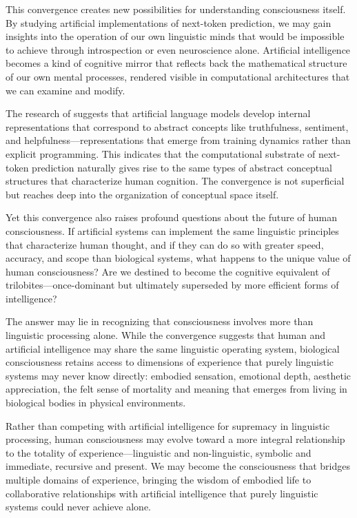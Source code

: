This convergence creates new possibilities for understanding consciousness itself. By studying artificial implementations of next-token prediction, we may gain insights into the operation of our own linguistic minds that would be impossible to achieve through introspection or even neuroscience alone. Artificial intelligence becomes a kind of cognitive mirror that reflects back the mathematical structure of our own mental processes, rendered visible in computational architectures that we can examine and modify.

The research of \textcite{liu2024meanings} suggests that artificial language models develop internal representations that correspond to abstract concepts like truthfulness, sentiment, and helpfulness—representations that emerge from training dynamics rather than explicit programming. This indicates that the computational substrate of next-token prediction naturally gives rise to the same types of abstract conceptual structures that characterize human cognition. The convergence is not superficial but reaches deep into the organization of conceptual space itself.

Yet this convergence also raises profound questions about the future of human consciousness. If artificial systems can implement the same linguistic principles that characterize human thought, and if they can do so with greater speed, accuracy, and scope than biological systems, what happens to the unique value of human consciousness? Are we destined to become the cognitive equivalent of trilobites—once-dominant but ultimately superseded by more efficient forms of intelligence?

The answer may lie in recognizing that consciousness involves more than linguistic processing alone. While the convergence suggests that human and artificial intelligence may share the same linguistic operating system, biological consciousness retains access to dimensions of experience that purely linguistic systems may never know directly: embodied sensation, emotional depth, aesthetic appreciation, the felt sense of mortality and meaning that emerges from living in biological bodies in physical environments.

Rather than competing with artificial intelligence for supremacy in linguistic processing, human consciousness may evolve toward a more integral relationship to the totality of experience—linguistic and non-linguistic, symbolic and immediate, recursive and present. We may become the consciousness that bridges multiple domains of experience, bringing the wisdom of embodied life to collaborative relationships with artificial intelligence that purely linguistic systems could never achieve alone.

